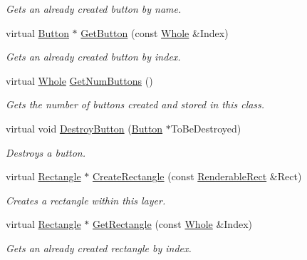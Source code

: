 \begin{DoxyCompactItemize}
\begin{DoxyCompactList}\small\item\em Gets an already created button by name. \item\end{DoxyCompactList}\item 
virtual \hyperlink{classphys_1_1UI_1_1Button}{Button} $\ast$ \hyperlink{classphys_1_1UI_1_1Layer_a96d3a5d016d435878c0184d02c839089}{GetButton} (const \hyperlink{namespacephys_a460f6bc24c8dd347b05e0366ae34f34a}{Whole} \&Index)
\begin{DoxyCompactList}\small\item\em Gets an already created button by index. \item\end{DoxyCompactList}\item 
virtual \hyperlink{namespacephys_a460f6bc24c8dd347b05e0366ae34f34a}{Whole} \hyperlink{classphys_1_1UI_1_1Layer_acebe9d678fe60e02fa4d37647bb9780c}{GetNumButtons} ()
\begin{DoxyCompactList}\small\item\em Gets the number of buttons created and stored in this class. \item\end{DoxyCompactList}\item 
virtual void \hyperlink{classphys_1_1UI_1_1Layer_ac011ff1dd631287500f5b2aff43726e3}{DestroyButton} (\hyperlink{classphys_1_1UI_1_1Button}{Button} $\ast$ToBeDestroyed)
\begin{DoxyCompactList}\small\item\em Destroys a button. \item\end{DoxyCompactList}\item 
virtual \hyperlink{classphys_1_1UI_1_1Rectangle}{Rectangle} $\ast$ \hyperlink{classphys_1_1UI_1_1Layer_aea42a78478489c92c39e5e0b1ca6d289}{CreateRectangle} (const \hyperlink{structphys_1_1UI_1_1RenderableRect}{RenderableRect} \&Rect)
\begin{DoxyCompactList}\small\item\em Creates a rectangle within this layer. \item\end{DoxyCompactList}\item 
virtual \hyperlink{classphys_1_1UI_1_1Rectangle}{Rectangle} $\ast$ \hyperlink{classphys_1_1UI_1_1Layer_ac96bb33f2c47d3ab1b615fc91aa5ad91}{GetRectangle} (const \hyperlink{namespacephys_a460f6bc24c8dd347b05e0366ae34f34a}{Whole} \&Index)
\begin{DoxyCompactList}\small\item\em Gets an already created rectangle by index. \item\end{DoxyCompactList}\item 

\end{DoxyCompactItemize}
